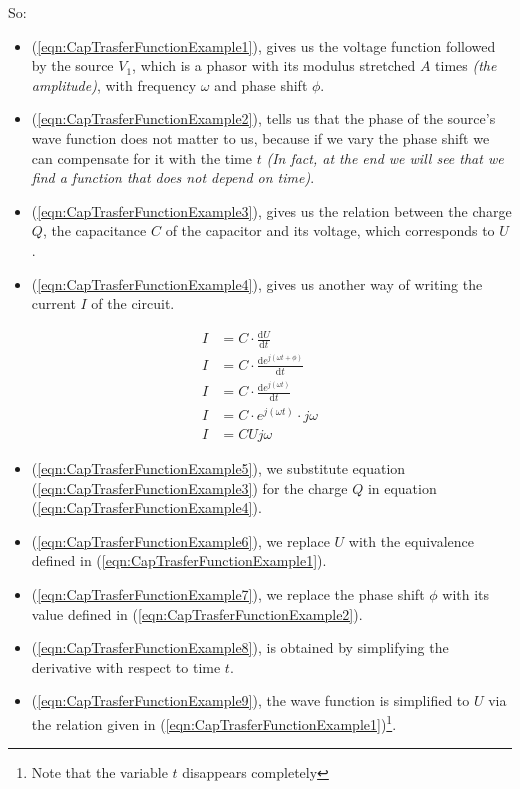 \documentclass[a4paper, 10pt, final]{article} %
\begin{document}
    \noindent So:
    \begin{itemize}
        \item (\ref{eqn:CapTrasferFunctionExample1}), gives us the voltage function followed by the source $V_1$, which is a
        phasor with its modulus stretched $A$ times \emph{(the amplitude)}, with frequency $\omega$ and phase shift $\phi$.
        \item (\ref{eqn:CapTrasferFunctionExample2}), tells us that the phase of the source's wave function does not matter to us, because if we vary the phase shift we can compensate for it with the time $t$ \emph{(In fact, at the end we will see that we find a function that does not depend on time)}.
        \item (\ref{eqn:CapTrasferFunctionExample3}), gives us the relation between the charge $Q$, the capacitance $C$ of the capacitor and its voltage, which corresponds to $U$.
        \item (\ref{eqn:CapTrasferFunctionExample4}), gives us another way of writing the current $I$ of the circuit.
    \end{itemize} 
    \begin{align}
        I &= C \cdot \frac{\textrm{d}U}{\textrm{d}t} \label{eqn:CapTrasferFunctionExample5} \\
        I &= C \cdot \frac{\textrm{d}e^{j \left( \omega t + \phi \right)}}{\textrm{d}t} \label{eqn:CapTrasferFunctionExample6} \\
        I &= C \cdot \frac{\textrm{d}e^{j \left( \omega t\right)}}{\textrm{d}t} \label{eqn:CapTrasferFunctionExample7} \\
        I &= C \cdot e^{j \left( \omega t \right)} \cdot j \omega \label{eqn:CapTrasferFunctionExample8} \\
        I &= C U j \omega \label{eqn:CapTrasferFunctionExample9}
    \end{align}
    \begin{itemize}
        \item (\ref{eqn:CapTrasferFunctionExample5}), we substitute equation (\ref{eqn:CapTrasferFunctionExample3}) for the charge $Q$ in equation (\ref{eqn:CapTrasferFunctionExample4}).
        \item (\ref{eqn:CapTrasferFunctionExample6}), we replace $U$ with the equivalence defined in (\ref{eqn:CapTrasferFunctionExample1}).
        \item (\ref{eqn:CapTrasferFunctionExample7}), we replace the phase shift $\phi$ with its value defined in (\ref{eqn:CapTrasferFunctionExample2}).
        \item (\ref{eqn:CapTrasferFunctionExample8}), is obtained by simplifying the derivative with respect to time $t$.
        \item (\ref{eqn:CapTrasferFunctionExample9}), the wave function is simplified to $U$ via the relation given in (\ref{eqn:CapTrasferFunctionExample1})\footnote{Note that the variable $t$ disappears completely}.
    \end{itemize}
\end{document}
